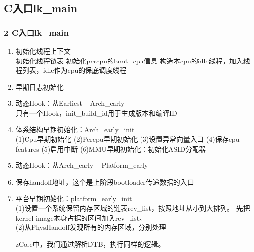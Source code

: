 \documentclass[
8pt, %
]{beamer}
\begin{document}
	\subsection{C入口lk\_main}

	\begin{frame}
		\frametitle{2 C入口lk\_main}
		\begin{enumerate}
			\item 初始化线程上下文\\
			初始化线程链表
			初始化percpu的boot\_cpu信息
			构造本cpu的idle线程，加入线程列表，idle作为cpu的保底调度线程
			\item 早期日志初始化
			\item 动态Hook：从Earliest ~ Arch\_early\\
			只有一个Hook，init\_build\_id用于生成版本和编译ID
			\item 体系结构早期初始化：Arch\_early\_init\\
			(1)Cpu早期初始化
			(2)Percpu早期初始化
			(3)设置异常向量入口
			(4)保存cpu features
			(5)启用中断
			(6)MMU早期初始化：初始化ASID分配器
			\item 动态Hook：从Arch\_early ~ Platform\_early
			\item 保存handoff地址，这个是上阶段bootloader传递数据的入口
			\item 平台早期初始化：platform\_early\_init\\
			(1)设置一个系统保留内存区域的链表rev\_list，按照地址从小到大排列。
			先把kernel image本身占据的区间加入rev\_list。\\
			(2)从PhysHandoff发现所有的内存区域，分别处理
			\begin{block}{}
				zCore中，我们通过解析DTB，执行同样的逻辑。
			\end{block}
		\end{enumerate}
	\end{frame}
\end{document}
